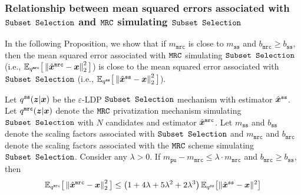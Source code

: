 \subsubsection{Relationship between mean squared errors associated with \texorpdfstring{$\texttt{Subset Selection}$}{Subset Selection} and \texorpdfstring{$\texttt{MRC}$}{MRC} simulating \texorpdfstring{$\texttt{Subset Selection}$}{Subset Selection}}\label{appendix:mrc_ss_scaling_mse}
In the following Proposition,
we show that if $m_{\texttt{mrc}}$ is close to $m_{\texttt{ss}}$ and $b_{\texttt{mrc}} \geq b_{\texttt{ss}}$, then the mean squared error associated with $\texttt{MRC}$ simulating $\texttt{Subset Selection}$ (i.e., $\mathbb{E}_{q^{\texttt{mrc}}} \big[ \left\lVert  \hat{{\boldsymbol{x}}}^\texttt{mrc} - {\boldsymbol{x}} \right\rVert^2_2  \big]$) is close to the mean squared error associated with $\texttt{Subset Selection}$ (i.e., $\mathbb{E}_{q^{\texttt{ss}}} \big[ \left\lVert  \hat{{\boldsymbol{x}}}^\texttt{ss} - {\boldsymbol{x}} \right\rVert^2_2  \big]$).
\begin{proposition}\label{proposition:mrc_mse_wrt_ss}
Let $q^{\texttt{ss}}({\boldsymbol{z}} | {\boldsymbol{x}})$ be the  $\varepsilon$-LDP \emph{$\texttt{Subset Selection}$} mechanism with estimator $\hat{{\boldsymbol{x}}}^{\texttt{ss}}$. Let $q^{\texttt{mrc}}({\boldsymbol{z}}|{\boldsymbol{x}})$ denote the \emph{$\texttt{MRC}$} privatization mechanism simulating \emph{$\texttt{Subset Selection}$} with $N$ candidates and estimator $\hat{{\boldsymbol{x}}}^{\texttt{mrc}}$.
Let $m_{\texttt{ss}}$ and $b_{\texttt{ss}}$ denote the scaling factors  associated with \emph{$\texttt{Subset Selection}$} and $m_\texttt{mrc}$ and $b_\texttt{mrc}$ denote the scaling factors associated with the \emph{$\texttt{MRC}$} scheme simulating \emph{$\texttt{Subset Selection}$}. Consider any $\lambda > 0$. If $m_{\texttt{pu}} - m_\texttt{mrc} \leq \lambda \cdot m_\texttt{mrc}$ and $b_{\texttt{mrc}} \geq b_{\texttt{ss}}$, then 
  \begin{align}
    \mathbb{E}_{q^{\texttt{mrc}}} \big[ \left\lVert  \hat{{\boldsymbol{x}}}^\texttt{mrc} - {\boldsymbol{x}} \right\rVert^2_2  \big]  \leq  \left( 1+4\lambda +5\lambda^2 + 2\lambda^3 \right)  \mathbb{E}_{q^{\texttt{ss}}}\big[\|\hat{{\boldsymbol{x}}}^{\texttt{ss}} - {\boldsymbol{x}}\|^2\big]
\end{align}
\end{proposition}
